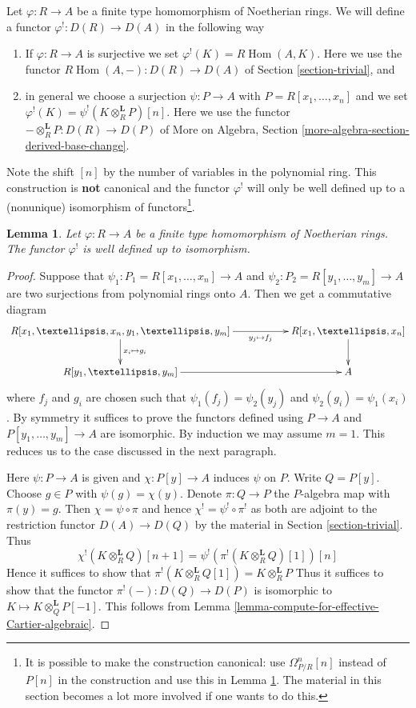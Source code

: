\documentclass{stacks-project}
\theoremstyle{plain}
\newtheorem{lemma}[subsection]{Lemma}
\theoremstyle{definition}
\theoremstyle{remark}
\numberwithin{equation}{subsection}
\def\Hom{\mathop{\mathrm{Hom}}\nolimits}
\begin{document}
\medskip\noindent
Let $\varphi : R \to A$ be a finite type homomorphism of Noetherian rings.
We will define a functor $\varphi^! : D(R) \to D(A)$ in the following way
\begin{enumerate}
\item If $\varphi : R \to A$ is surjective we set
$\varphi^!(K) = R\Hom(A, K)$. Here we use the functor
$R\Hom(A, -) : D(R) \to D(A)$ of
Section \ref{section-trivial}, and
\item in general we choose a surjection $\psi : P \to A$ with
$P = R[x_1, \ldots, x_n]$ and we set
$\varphi^!(K) = \psi^!(K \otimes_R^\mathbf{L} P)[n]$.
Here we use the functor
$- \otimes_R^\mathbf{L} P : D(R) \to D(P)$
of More on Algebra, Section \ref{more-algebra-section-derived-base-change}.
\end{enumerate}
Note the shift $[n]$ by the number of variables in the polynomial
ring. This construction is {\bf not} canonical and the functor
$\varphi^!$ will only be well defined up to a (nonunique) isomorphism of
functors\footnote{It is possible to make the construction canonical:
use $\Omega^n_{P/R}[n]$ instead of $P[n]$ in the
construction and use this in Lemma \ref{lemma-well-defined}.
The material in this section becomes a lot more involved
if one wants to do this.}.

\begin{lemma}
\label{lemma-well-defined}
Let $\varphi : R \to A$ be a finite type homomorphism of
Noetherian rings. The functor $\varphi^!$ is well defined
up to isomorphism.
\end{lemma}

\begin{proof}
Suppose that $\psi_1 : P_1 = R[x_1, \ldots, x_n] \to A$ and
$\psi_2 : P_2 = R[y_1, \ldots, y_m] \to A$ are two
surjections from polynomial rings onto $A$. Then we get a
commutative diagram
$$
\xymatrix{
R[x_1, \ldots, x_n, y_1, \ldots, y_m]
\ar[d]^{x_i \mapsto g_i} \ar[rr]_-{y_j \mapsto f_j} & &
R[x_1, \ldots, x_n] \ar[d] \\
R[y_1, \ldots, y_m] \ar[rr] & & A
}
$$
where $f_j$ and $g_i$ are chosen such that $\psi_1(f_j) = \psi_2(y_j)$
and $\psi_2(g_i) = \psi_1(x_i)$. By symmetry it suffices to prove
the functors defined using $P \to A$ and $P[y_1, \ldots, y_m] \to A$
are isomorphic. By induction we may assume $m = 1$. This reduces
us to the case discussed in the next paragraph.

\medskip\noindent
Here $\psi : P \to A$ is given and $\chi : P[y] \to A$ induces
$\psi$ on $P$. Write $Q = P[y]$.
Choose $g \in P$ with $\psi(g) = \chi(y)$.
Denote $\pi : Q \to P$ the $P$-algebra map
with $\pi(y) = g$. Then $\chi = \psi \circ \pi$ and hence
$\chi^! = \psi^! \circ \pi^!$ as both are
adjoint to the restriction functor $D(A) \to D(Q)$ by the material
in Section \ref{section-trivial}. Thus
$$
\chi^!\left(K \otimes_R^\mathbf{L} Q\right)[n + 1] =
\psi^!\left(\pi^!\left(K \otimes_R^\mathbf{L} Q\right)[1]\right)[n]
$$
Hence it suffices to show that
$\pi^!(K \otimes_R^\mathbf{L} Q[1]) = K \otimes_R^\mathbf{L} P$
Thus it suffices to show that the functor
$\pi^!(-) : D(Q) \to D(P)$
is isomorphic to $K \mapsto K \otimes_Q^\mathbf{L} P[-1]$.
This follows from Lemma \ref{lemma-compute-for-effective-Cartier-algebraic}.
\end{proof}
\end{document}
